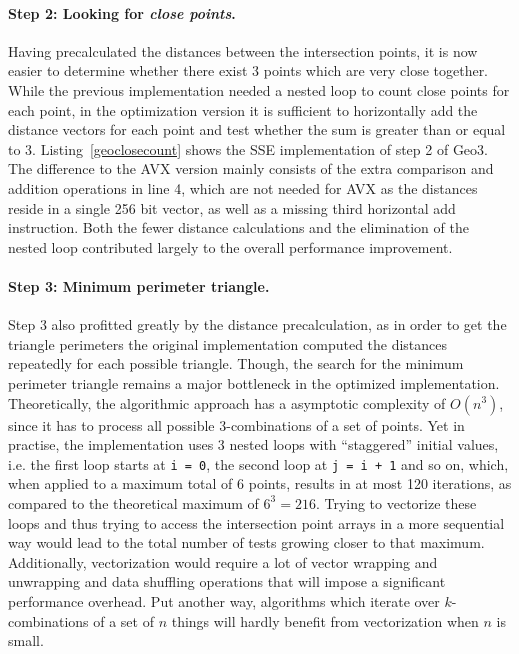 
\paragraph{Step 2: Looking for \emph{close points}.} Having precalculated the distances between the intersection points, it is now easier to determine whether there exist 3 points which are very close together. While the previous implementation needed a nested loop to count close points for each point, in the optimization version it is sufficient to horizontally add the distance vectors for each point and test whether the sum is greater than or equal to 3. Listing~\ref{geoclosecount} shows the SSE implementation of step 2 of Geo3. The difference to the AVX version mainly consists of the extra comparison and addition operations in line 4, which are not needed for AVX as the distances reside in a single 256 bit vector, as well as a missing third horizontal add instruction. Both the fewer distance calculations and the elimination of the nested loop contributed largely to the overall performance improvement.


\paragraph{Step 3: Minimum perimeter triangle.} Step 3 also profitted greatly by the distance precalculation, as in order to get the triangle perimeters the original implementation computed the distances repeatedly for each possible triangle. Though, the search for the minimum perimeter triangle remains a major bottleneck in the optimized implementation. Theoretically, the algorithmic approach has a asymptotic complexity of $O(n^{3})$, since it has to process all possible 3-combinations of a set of points. Yet in practise, the implementation uses 3 nested loops with ``staggered'' initial values, i.e. the first loop starts at \texttt{i = 0}, the second loop at \texttt{j = i + 1} and so on, which, when applied to a maximum total of 6 points, results in at most 120 iterations, as compared to the theoretical maximum of $6^{3} = 216$. Trying to vectorize these loops and thus trying to access the intersection point arrays in a more sequential way would lead to the total number of tests growing closer to that maximum. Additionally, vectorization would require a lot of vector wrapping and unwrapping and data shuffling operations that will impose a significant performance overhead. Put another way, algorithms which iterate over $k$-combinations of a set of $n$ things will hardly benefit from vectorization when $n$ is small.

